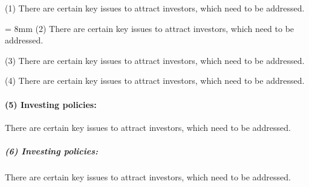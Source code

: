\documentclass[11pt,a4paper]{article}
\begin{document}
    \par
    (1) There are certain key issues to attract
    investors, which need to be addressed.
    \par \parindent = 8mm
    (2) There are certain key issues to attract
    investors, which need to be addressed.
    \par \noindent \parskip 2mm
    (3) There are certain key issues to attract
    investors, which need to be addressed.
    \par
    (4) There are certain key issues to attract
    investors, which need to be addressed.
    \paragraph{(5) Investing policies:}
    There are certain key issues to attract
    investors, which need to be addressed.
    \subparagraph{(6) Investing policies:}
    There are certain key issues to attract
    investors, which need to be addressed.
\end{document}
